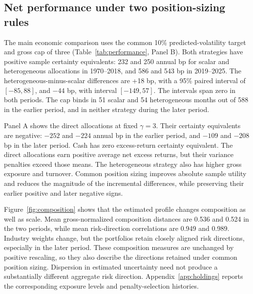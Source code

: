 \subsection{Net performance under two position-sizing rules}
The main economic comparison uses the common 10\% predicted-volatility target and gross cap of three (Table~\ref{tab:performance}, Panel B). Both strategies have positive sample certainty equivalents: 232 and 250 annual bp for scalar and heterogeneous allocations in 1970--2018, and 586 and 543 bp in 2019--2025. The heterogeneous-minus-scalar differences are +18 bp, with a 95\% paired interval of $[-85,88]$, and $-44$ bp, with interval $[-149,57]$. The intervals span zero in both periods. The cap binds in 51 scalar and 54 heterogeneous months out of 588 in the earlier period, and in neither strategy during the later period.

Panel A shows the direct allocations at fixed $\gamma=3$. Their certainty equivalents are negative: $-252$ and $-224$ annual bp in the earlier period, and $-109$ and $-208$ bp in the later period. Cash has zero excess-return certainty equivalent. The direct allocations earn positive average net excess returns, but their variance penalties exceed those means. The heterogeneous strategy also has higher gross exposure and turnover. Common position sizing improves absolute sample utility and reduces the magnitude of the incremental differences, while preserving their earlier positive and later negative signs.


Figure~\ref{fig:composition} shows that the estimated profile changes composition as well as scale. Mean gross-normalized composition distances are 0.536 and 0.524 in the two periods, while mean risk-direction correlations are 0.949 and 0.989. Industry weights change, but the portfolios retain closely aligned risk directions, especially in the later period. These composition measures are unchanged by positive rescaling, so they also describe the directions retained under common position sizing. Dispersion in estimated uncertainty need not produce a substantially different aggregate risk direction. Appendix~\ref{app:holdings} reports the corresponding exposure levels and penalty-selection histories.

